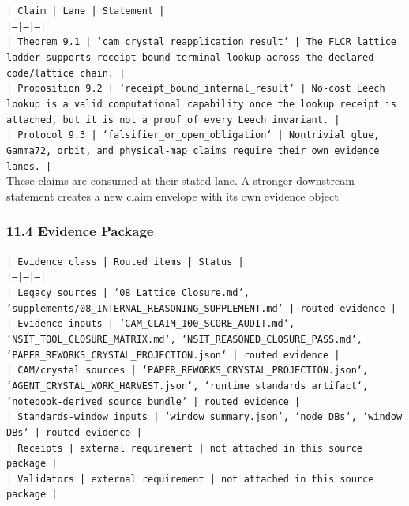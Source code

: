 \documentclass[11pt]{article}
\begin{document}
\noindent\texttt{| Claim | Lane | Statement |}\\
\noindent\texttt{|---|---|---|}\\
\noindent\texttt{| Theorem 9.1 | `cam\_crystal\_reapplication\_result` | The FLCR lattice ladder supports receipt-bound terminal lookup across the declared code/lattice chain. |}\\
\noindent\texttt{| Proposition 9.2 | `receipt\_bound\_internal\_result` | No-cost Leech lookup is a valid computational capability once the lookup receipt is attached, but it is not a proof of every Leech invariant. |}\\
\noindent\texttt{| Protocol 9.3 | `falsifier\_or\_open\_obligation` | Nontrivial glue, Gamma72, orbit, and physical-map claims require their own evidence lanes. |}\\

These claims are consumed at their stated lane. A stronger downstream statement
creates a new claim envelope with its own evidence object.

\subsubsection*{11.4 Evidence Package}

\noindent\texttt{| Evidence class | Routed items | Status |}\\
\noindent\texttt{|---|---|---|}\\
\noindent\texttt{| Legacy sources | `08\_Lattice\_Closure.md`, `supplements/08\_INTERNAL\_REASONING\_SUPPLEMENT.md` | routed evidence |}\\
\noindent\texttt{| Evidence inputs | `CAM\_CLAIM\_100\_SCORE\_AUDIT.md`, `NSIT\_TOOL\_CLOSURE\_MATRIX.md`, `NSIT\_REASONED\_CLOSURE\_PASS.md`, `PAPER\_REWORKS\_CRYSTAL\_PROJECTION.json` | routed evidence |}\\
\noindent\texttt{| CAM/crystal sources | `PAPER\_REWORKS\_CRYSTAL\_PROJECTION.json`, `AGENT\_CRYSTAL\_WORK\_HARVEST.json`, `runtime standards artifact`, `notebook-derived source bundle` | routed evidence |}\\
\noindent\texttt{| Standards-window inputs | `window\_summary.json`, `node DBs`, `window DBs` | routed evidence |}\\
\noindent\texttt{| Receipts | external requirement | not attached in this source package |}\\
\noindent\texttt{| Validators | external requirement | not attached in this source package |}\\
\end{document}
